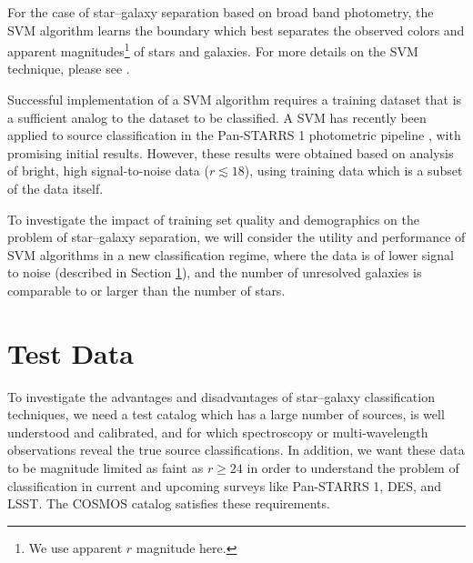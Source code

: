\documentclass[12pt,preprint]{aastex}
\begin{document}
For the case of star--galaxy separation based on broad
band photometry, the SVM algorithm learns the boundary which best
separates the observed colors and apparent magnitudes\footnote{We use
  apparent $r$ magnitude here.} of stars and galaxies.  For more
details on the SVM technique, please see \citet{muller01}.

Successful implementation of a SVM algorithm requires a training dataset
that is a sufficient analog to the dataset to be classified.  A SVM has
recently been applied to source classification in the Pan-STARRS 1
photometric pipeline \citep{saglia12}, with promising initial
results. However, these results were obtained based on analysis of 
bright, high signal-to-noise data ($r\lesssim18$), using training data 
which is a subset of the data itself.

To investigate the impact of training set quality and demographics on
the problem of star--galaxy separation, we will consider the utility
and performance of SVM algorithms in a new classification regime,
where the data is of lower signal to noise (described in Section
\ref{sec:data}), and the number of unresolved galaxies is comparable
to or larger than the number of stars.

\section{Test Data}
\label{sec:data}

To investigate the advantages and disadvantages of star--galaxy
classification techniques, we need a test catalog which has a large
number of sources, is well understood and calibrated, and for
which spectroscopy or multi-wavelength observations reveal the true
source classifications.  In addition, we want these data to be
magnitude limited as faint as $r\ge24$ in order to understand the
problem of classification in current and upcoming surveys like
Pan-STARRS 1, DES, and LSST.  The COSMOS catalog satisfies these
requirements.   
\end{document}
